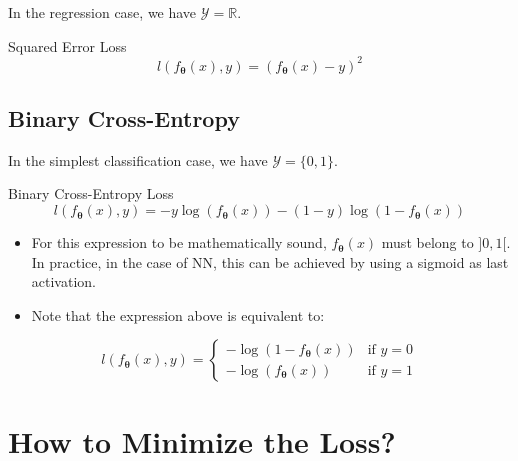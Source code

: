 \documentclass{book}
\newcommand{\param}{\boldsymbol{\theta}}
\newcommand{\R}{\mathbb{R}}
\begin{document}
In the regression case, we have $\mathcal{Y} = \R$.

\begin{block}{Squared Error Loss}
\[
l(f_{\param}(x), y) = (f_{\param}(x) - y)^2
\]
\end{block}

\subsection{Binary Cross-Entropy}

In the simplest classification case, we have $\mathcal{Y}=\{0, 1\}$.

\begin{block}{Binary Cross-Entropy Loss}
\[
l(f_{\param}(x), y) = - y \log(f_{\param}(x)) - (1 - y) \log(1 - f_{\param}(x))
\]
\end{block}

\begin{itemize}
\item For this expression to be mathematically sound, $f_{\param}(x)$ must belong to $]0, 1[$. In practice, in the case of NN, this can be achieved by using a sigmoid as last activation.
\item Note that the expression above is equivalent to:
\end{itemize}

\[
l(f_{\param}(x), y) = \left\{
\begin{array}{ll}
- \log(1 - f_{\param}(x)) & \mbox{if } y=0 \\
- \log(f_{\param}(x)) & \mbox{if } y=1
\end{array}
\right.
\]

\section{How to Minimize the Loss?}
\end{document}
